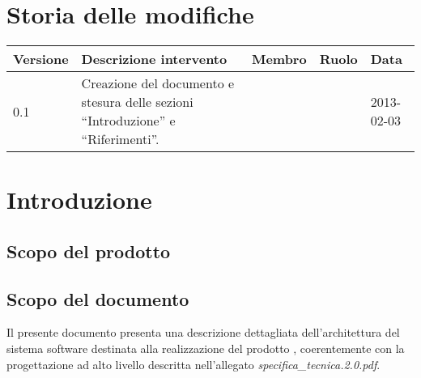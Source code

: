 





\section*{Storia delle modifiche}
\begin{center}
\begin{longtable}{lp{}lll}
\toprule
Versione & Descrizione intervento & Membro & Ruolo & Data\\
\midrule %
0.1 & Creazione del documento e stesura delle sezioni ``Introduzione'' e ``Riferimenti''. & &  & 2013-02-03\\
\bottomrule
\end{longtable}
\end{center}
\newpage



\setcounter{page}{1}
\pagestyle{normal}

\newpage

\section{Introduzione}
\subsection{Scopo del prodotto}
\purpose

\subsection{Scopo del documento}
Il presente documento presenta una descrizione dettagliata dell'architettura del sistema software destinata alla realizzazione del prodotto \caName{}, coerentemente con la progettazione ad alto livello descritta nell'allegato \textit{specifica\_tecnica.2.0.pdf}.

